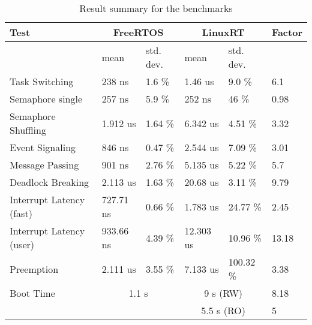 \begin{table}[htbp]
	\centering
		\begin{tabular}{|l||l|l||l|l||l|}
			\hline
				Test & \multicolumn{2}{|c||}{FreeRTOS} & \multicolumn{2}{|c||}{LinuxRT}	& Factor				 	 \\
				\hline 
																						& mean			 & std. dev. 		 & mean			  & std. dev. 	&			 \\
				\hline 
				Task Switching											& 238 ns	 	 & 1.6 \%		 		 & 1.46 us	  & 9.0 \%			&	6.1	 \\
			  \hline
			  Semaphore single									  & 257 ns		 & 5.9 \%  			 & 252 ns		  &	46 \% 			&	0.98  \\
			  \hline 
			  Semaphore Shuffling 								& 1.912 us 	 & 1.64 \% 			 & 6.342 us  	&	4.51 \%			&	3.32  \\ 
			  \hline
			  Event Signaling											& 846 ns		 & 0.47 \% 			 & 2.544 us		& 7.09 \%			&	3.01  \\
			  \hline
			  Message Passing											& 901 ns		 & 2.76 \% 			 & 5.135 us		& 5.22 \%			&	5.7   \\
			  \hline
			  Deadlock Breaking										& 2.113 us	 & 1.63 \% 			 & 20.68 us		& 3.11 \%			&	9.79  \\
			  \hline
			  Interrupt Latency (fast)						& 727.71 ns	 & 0.66 \% 			 & 1.783 us		& 24.77 \%		&	2.45  \\
			  \hline
			  Interrupt Latency (user)						& 933.66 ns	 & 4.39 \% 			 & 12.303 us  & 10.96 \%		&	13.18 \\
			  \hline
			  Preemption													& 2.111 us	 & 3.55 \% 			 & 7.133 us		& 100.32 \%		&	3.38  \\
			  \hline
			  \hline
			  Boot Time											&  \multicolumn{2}{|c|}{1.1 s} & 	\multicolumn{2}{|c|}{9 s (RW)} & 8.18 \\ 
			  		 													&  \multicolumn{2}{|c|}{} 	 & 	\multicolumn{2}{|c|}{5.5 s (RO)} & 5 \\ 
			\hline
		\end{tabular}
	\caption{Result summary for the benchmarks}
	\label{tab_summary}
\end{table}

